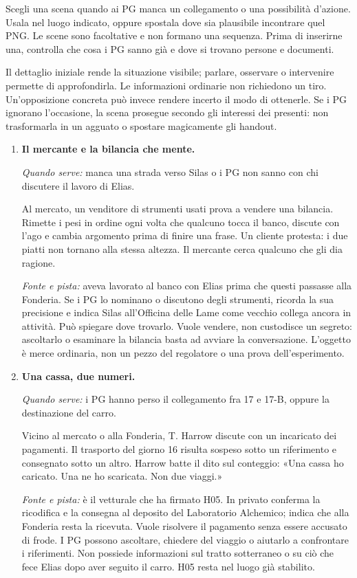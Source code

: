 \documentclass[11pt,a4paper]{article}
\begin{document}
Scegli una scena quando ai PG manca un collegamento o una possibilità d'azione. Usala nel luogo indicato, oppure spostala dove sia plausibile incontrare quel PNG. Le scene sono facoltative e non formano una sequenza. Prima di inserirne una, controlla che cosa i PG sanno già e dove si trovano persone e documenti.

Il dettaglio iniziale rende la situazione visibile; parlare, osservare o intervenire permette di approfondirla. Le informazioni ordinarie non richiedono un tiro. Un'opposizione concreta può invece rendere incerto il modo di ottenerle. Se i PG ignorano l'occasione, la scena prosegue secondo gli interessi dei presenti: non trasformarla in un agguato o spostare magicamente gli handout.

\begin{enumerate}[leftmargin=*]
\item \textbf{Il mercante e la bilancia che mente.}

\textit{Quando serve:} manca una strada verso Silas o i PG non sanno con chi discutere il lavoro di Elias.

Al mercato, un venditore di strumenti usati prova a vendere una bilancia. Rimette i pesi in ordine ogni volta che qualcuno tocca il banco, discute con l'ago e cambia argomento prima di finire una frase. Un cliente protesta: i due piatti non tornano alla stessa altezza. Il mercante cerca qualcuno che gli dia ragione.

\textit{Fonte e pista:} aveva lavorato al banco con Elias prima che questi passasse alla Fonderia. Se i PG lo nominano o discutono degli strumenti, ricorda la sua precisione e indica Silas all'Officina delle Lame come vecchio collega ancora in attività. Può spiegare dove trovarlo. Vuole vendere, non custodisce un segreto: ascoltarlo o esaminare la bilancia basta ad avviare la conversazione. L'oggetto è merce ordinaria, non un pezzo del regolatore o una prova dell'esperimento.

\item \textbf{Una cassa, due numeri.}

\textit{Quando serve:} i PG hanno perso il collegamento fra 17 e 17-B, oppure la destinazione del carro.

Vicino al mercato o alla Fonderia, T. Harrow discute con un incaricato dei pagamenti. Il trasporto del giorno 16 risulta sospeso sotto un riferimento e consegnato sotto un altro. Harrow batte il dito sul conteggio: «Una cassa ho caricato. Una ne ho scaricata. Non due viaggi.»

\textit{Fonte e pista:} è il vetturale che ha firmato H05. In privato conferma la ricodifica e la consegna al deposito del Laboratorio Alchemico; indica che alla Fonderia resta la ricevuta. Vuole risolvere il pagamento senza essere accusato di frode. I PG possono ascoltare, chiedere del viaggio o aiutarlo a confrontare i riferimenti. Non possiede informazioni sul tratto sotterraneo o su ciò che fece Elias dopo aver seguito il carro. H05 resta nel luogo già stabilito.


\end{enumerate}
\end{document}
